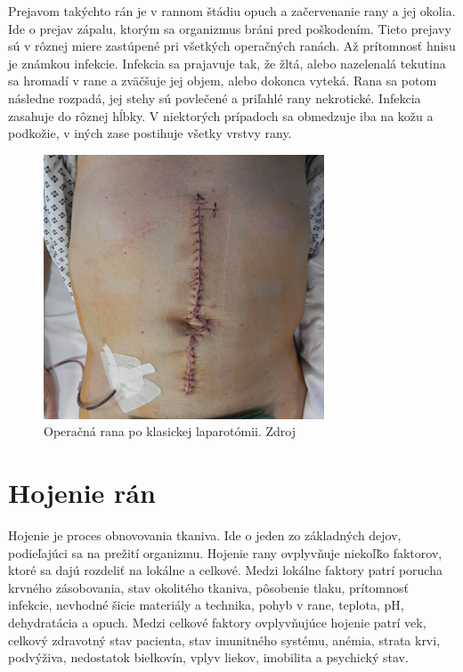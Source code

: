 Prejavom takýchto rán je v rannom štádiu opuch a začervenanie rany a jej okolia. Ide o prejav zápalu, ktorým sa organizmus bráni pred poškodením. Tieto prejavy sú v rôznej miere zastúpené pri všetkých operačných ranách. Až prítomnosť hnisu je známkou infekcie. Infekcia sa prajavuje tak, že žltá, alebo nazelenalá tekutina sa hromadí v rane a zväčšuje jej objem, alebo dokonca vyteká. Rana sa potom následne rozpadá, jej stehy sú povlečené a priľahlé rany nekrotické. Infekcia zasahuje do rôznej hĺbky. V niektorých prípadoch sa obmedzuje iba na kožu a podkožie, v iných zase postihuje všetky vrstvy rany.
\begin{figure}[h]
  \centering
  \includegraphics[scale=1]{fig/pooperacna-rana.png}
  \caption{Operačná rana po klasickej laparotómii. Zdroj \cite{XUKYT8x1LmEzzkqO}}
  \label{fig:pooperacna-rana}
\end{figure}

\section{Hojenie rán}
Hojenie je proces obnovovania tkaniva. Ide o jeden zo základných dejov, podieľajúci sa na prežití organizmu. Hojenie rany ovplyvňuje niekoľǩo faktorov, ktoré sa dajú rozdeliť na lokálne a celkové. Medzi lokálne faktory patrí porucha krvného zásobovania, stav okolitého tkaniva, pôsobenie tlaku, prítomnosť infekcie, nevhodné šicie materiály a technika, pohyb v rane, teplota, pH, dehydratácia a opuch. Medzi celkové faktory ovplyvňujúce hojenie patrí vek, celkový zdravotný stav pacienta, stav imunitného systému, anémia, strata krvi, podvýživa, nedostatok bielkovín, vplyv liekov, imobilita a psychický stav.

